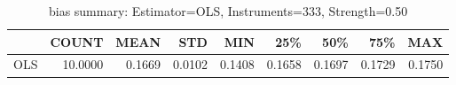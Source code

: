 \begin{table}[ht]
\centering
\caption{bias summary: Estimator=OLS, Instruments=333, Strength=0.50}
\begin{tabular}{lrrrrrrrr}
\toprule
 & COUNT & MEAN & STD & MIN & 25\% & 50\% & 75\% & MAX \\
\midrule
OLS & 10.0000 & 0.1669 & 0.0102 & 0.1408 & 0.1658 & 0.1697 & 0.1729 & 0.1750 \\
\bottomrule
\end{tabular}
\end{table}
